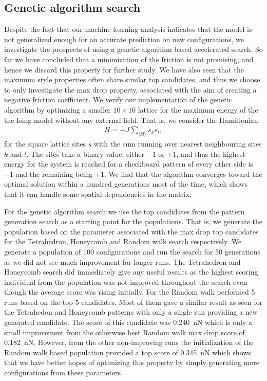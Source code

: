 \subsection{Genetic algorithm search}
Despite the fact that our machine learning analysis indicates that the model is not generalized enough for an accurate prediction on new configurations, we investigate the prospects of using a genetic algorithm based accelerated search. So far we have concluded that a minimization of the friction is not
promising, and hence we discard this property for further study. We have also
seen that the maximum style properties often share similar top candidates, and
thus we choose to only investigate the max drop property, associated with the
aim of creating a negative friction coefficient. We verify our implementation of the genetic algorithm by optimizing a smaller $10 \times 10$ lattice for the maximum energy of the the Ising model without any external field. That is, we consider the Hamiltonian 
\begin{align*}
  H = -J\sum_{\langle kl \rangle} s_k s_l,
\end{align*}
for the square lattice sites $s$ with the sum running over nearest neighbouring sites $k$ and $l$. The sites take a binary value, either $-1$ or $+1$, and thus the highest energy for the system is reached for a checkboard pattern of every other side is $-1$ and the remaining being $+1$. We find that the algorithm converges toward the optimal solution within a hundred generations most of the time, which shows that it can handle some spatial dependencies in the matrix.

For the genetic algorithm search we use the top candidates from the pattern generation search as a starting point for the populations. That is, we generate the population based on the parameter associated with the max drop top candidates for the Tetrahedron, Honeycomb and Random walk search respectively. We generate a population of 100 configurations and run the search for  50 generations as we did not see much improvement for longer runs. The Tetrahedron and Honeycomb search did immediately give any useful results as the highest scoring individual from the population was not improved throughout the search even though the average score was rising initially. For the Random walk performed 5 runs based on the top 5 candidates. Most of them gave a similar result as seen for the Tetrahedon and
Honeycomb patterns with only a single run providing a new generated candidate. The score of this candidate was \SI{0.240}{nN} which is only a small improvement from the otherwise best Random walk max drop score of
\SI{0.182}{nN}. However, from the other non-improving runs the initialization of the Random walk based population provided a top score of \SI{0.345}{nN} which shows that we have better hopes of optimizing this property by simply generating more configurations from these parameters. 

